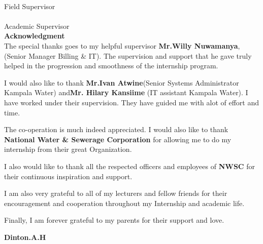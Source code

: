 \documentclass{article}
\begin{document}
\makebox[2.5in]{\hrulefill} \hspace{0.3in}\makebox[2.5in]{\dotfill}\\
Field Supervisor \\
\vspace{.1in}
\makebox[2.5in]{\hrulefill} \hspace{0.3in}\makebox[2.5in]{\dotfill}\\
Academic Supervisor \\
\newpage
\textbf{Acknowledgment}\\
The special thanks goes to my helpful supervisor \textbf{Mr.Willy Nuwamanya},(Senior Manager Billing \& IT). The supervision and support that he gave truly helped in the progression and smoothness of the internship program.
\par I would also like to thank \textbf{Mr.Ivan Atwine}(Senior Systems Administrator Kampala Water) and\textbf{Mr. Hilary Kansiime} (IT assistant Kampala Water). I have worked under their supervision. They have guided me with alot of effort and time.
\par The co-operation is much indeed appreciated. I would also like to thank \textbf{National Water \& Sewerage Corporation} for allowing me to do my internship from their great Organization.
\par I also would like to thank all the respected officers and employees of \textbf{NWSC} for their continuous inspiration and support.
\par I am also very grateful to all of my lecturers and fellow friends for their encouragement and cooperation throughout my Internship and academic life.
\par Finally, I am forever grateful to my parents for their support and love.
\begin{flushright}
\textbf{Dinton.A.H}
\end{flushright}
\end{document}
